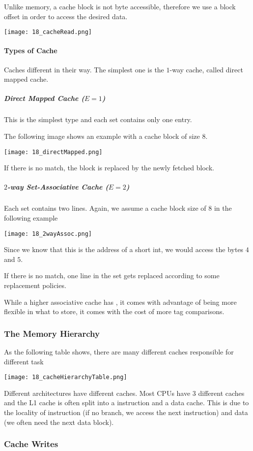 Unlike memory, a cache block is not byte accessible, therefore we use a block offset in order to access the desired data.

\texttt{[image: 18\_cacheRead.png]}

\paragraph{Types of Cache}
Caches different in their way. The simplest one is the $1$-way cache, called direct mapped cache.

\subparagraph{Direct Mapped Cache ($E=1$)}
This is the simplest type and each set contains only one entry.

The following image shows an example with a cache block of size $8$.

\texttt{[image: 18\_directMapped.png]}

If there is no match, the block is replaced by the newly fetched block.

\subparagraph{$2$-way Set-Associative Cache ($E=2$)}
Each set contains two lines. Again, we assume a cache block size of $8$ in the following example

\texttt{[image: 18\_2wayAssoc.png]}

Since we know that this is the address of a short int, we would access the bytes $4$ and $5$.

If there is no match, one line in the set gets replaced according to some replacement policies.

While a higher associative cache has , it comes with advantage of being more flexible in what to store, it comes with the cost of more tag comparisons.

\subsubsection{The Memory Hierarchy}
As the following table shows, there are many different caches responsible for different task

\texttt{[image: 18\_cacheHierarchyTable.png]}

Different architectures have different caches. Most CPUs have $3$ different caches and the L1 cache is often split into a instruction and a data cache. This is due to the locality of instruction (if no branch, we access the next instruction) and data (we often need the next data block).

\subsubsection{Cache Writes}

